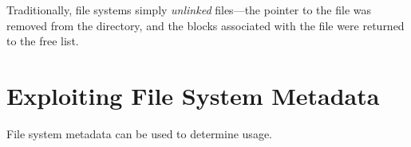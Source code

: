 Traditionally, file systems simply \emph{unlinked} files---the pointer
to the file was removed from the directory, and the blocks associated
with the file were returned to the free list.


\section{Exploiting File System Metadata}
File system metadata can be used to determine usage. 
\cite{dfrws2011:JonathanGrier}
